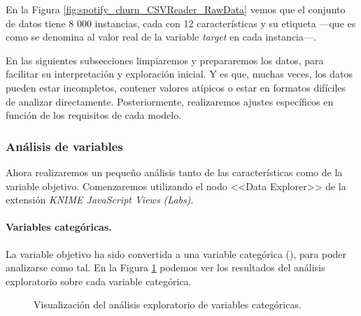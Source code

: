 En la Figura \ref{fig:spotify_churn_CSVReader_RawData} vemos que el conjunto de datos tiene 8 000 instancias, cada con 12 características y su etiqueta ---que es como se denomina al valor real de la variable \textit{target} en cada instancia---.

En las siguientes subsecciones limpiaremos y prepararemos los datos, para facilitar su interpretación y exploración inicial. Y es que, muchas veces, los datos pueden estar incompletos, contener valores atípicos o estar en formatos difíciles de analizar directamente. Posteriormente, realizaremos ajustes específicos en función de los requisitos de cada modelo.

\subsubsection{Análisis de variables}

Ahora realizaremos un pequeño análisis tanto de las características como de la variable objetivo. Comenzaremos utilizando el nodo <<Data Explorer>> de la extensión \textit{KNIME JavaScript Views (Labs)}.

\paragraph*{Variables categóricas.}

La variable objetivo ha sido convertida a una variable categórica (), para poder analizarse como tal. En la Figura \ref{fig:spotify_churn_Statistics_Nominal_Attributes} podemos ver los resultados del análisis exploratorio sobre cada variable categórica. 

\begin{figure}[h!]
    \caption{Visualización del análisis exploratorio de variables categóricas.}
    \label{fig:spotify_churn_Statistics_Nominal_Attributes}
\end{figure}

